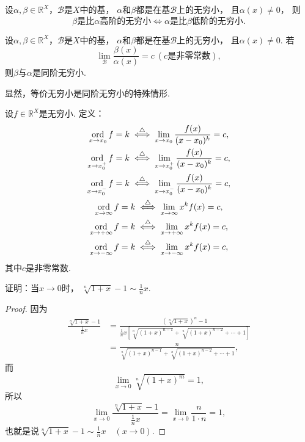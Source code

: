 \begin{proposition}
设\(\alpha,\beta\in\mathbb{R}^X\)，\(\mathcal{B}\)是\(X\)中的基，
\(\alpha\)和\(\beta\)都是在基\(\mathcal{B}\)上的无穷小，
且\(\alpha(x)\neq0\)，
则\[
	\text{\(\beta\)是比\(\alpha\)高阶的无穷小}
	\iff
	\text{\(\alpha\)是比\(\beta\)低阶的无穷小}.
\]
\end{proposition}

\begin{proposition}
设\(\alpha,\beta\in\mathbb{R}^X\)，\(\mathcal{B}\)是\(X\)中的基，
\(\alpha\)和\(\beta\)都是在基\(\mathcal{B}\)上的无穷小，
且\(\alpha(x)\neq0\).
若\[
	\lim_\mathcal{B} \frac{\beta(x)}{\alpha(x)} = c\ (\text{$c$是非零常数}),
\]
则\(\beta\)与\(\alpha\)是同阶无穷小.
\end{proposition}

\begin{remark}
显然，等价无穷小是同阶无穷小的特殊情形.
\end{remark}

\begin{definition}
设\(f\in\mathbb{R}^X\)是无穷小.
定义：\begin{gather*}
	\operatorname*{ord}_{x \to x_0} f = k
	\overset{\triangle}{\iff}
	\lim_{x \to x_0} \frac{f(x)}{(x-x_0)^k} = c, \\
	\operatorname*{ord}_{x \to x_0^+} f = k
	\overset{\triangle}{\iff}
	\lim_{x \to x_0^+} \frac{f(x)}{(x-x_0)^k} = c, \\
	\operatorname*{ord}_{x \to x_0^-} f = k
	\overset{\triangle}{\iff}
	\lim_{x \to x_0^-} \frac{f(x)}{(x-x_0)^k} = c, \\
	\operatorname*{ord}_{x \to \infty} f = k
	\overset{\triangle}{\iff}
	\lim_{x \to \infty} x^k f(x) = c, \\
	\operatorname*{ord}_{x \to +\infty} f = k
	\overset{\triangle}{\iff}
	\lim_{x \to +\infty} x^k f(x) = c, \\
	\operatorname*{ord}_{x \to -\infty} f = k
	\overset{\triangle}{\iff}
	\lim_{x \to -\infty} x^k f(x) = c,
\end{gather*}
其中\(c\)是非零常数.
\end{definition}

\begin{example}
证明：当\(x\to0\)时，
\(\sqrt[n]{1+x} - 1 \sim \frac1n x\).
\begin{proof}
因为\begin{align*}
	\frac{\sqrt[n]{1+x} - 1}{\frac1n x}
	&= \frac{(\sqrt[n]{1+x})^n - 1}{\frac1n x \left[ \sqrt[n]{(1+x)^{n-1}} + \sqrt[n]{(1+x)^{n-2}} + \dotsb + 1 \right]} \\
	&= \frac{n}{\sqrt[n]{(1+x)^{n-1}} + \sqrt[n]{(1+x)^{n-2}} + \dotsb + 1},
\end{align*}
而\[
	\lim_{x\to0} \sqrt[n]{(1+x)^m} = 1,
\]
所以\[
	\lim_{x\to0} \frac{\sqrt[n]{1+x} - 1}{\frac1n x} = \lim_{x\to0} \frac{n}{1 \cdot n} = 1,
\]
也就是说\(\sqrt[n]{1+x} - 1 \sim \frac1n x \quad(x\to0)\).
\end{proof}
\end{example}

